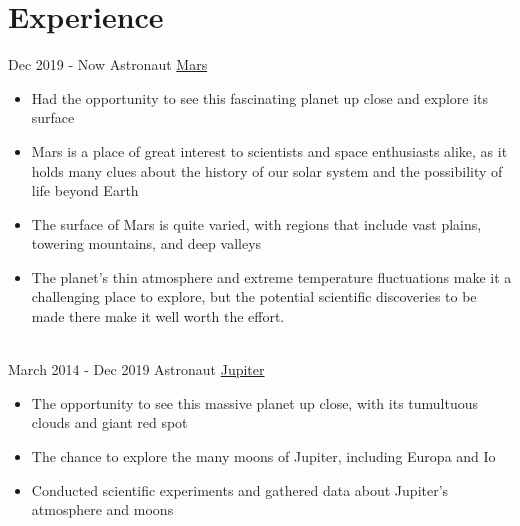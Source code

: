 
\section*{Experience}

\begin{twenty} %
	\twentyitem
	{Dec 2019 - }
	{Now}
	{Astronaut}
	{\href{https://en.wikipedia.org/wiki/Mars}{Mars}}
	{}
	{\begin{itemize}
	\item Had the opportunity to see this fascinating planet up close and explore its surface

	\item Mars is a place of great interest to scientists and space enthusiasts alike, as it holds many clues about the history of our solar system and the possibility of life beyond Earth
	
	\item The surface of Mars is quite varied, with regions that include vast plains, towering mountains, and deep valleys
	
	\item The planet's thin atmosphere and extreme temperature fluctuations make it a challenging place to explore, but the potential scientific discoveries to be made there make it well worth the effort.
	
	\end{itemize}}
	\\
	\twentyitem
	{March 2014 - }
	{Dec 2019}
	{Astronaut}
	{\href{https://en.wikipedia.org/wiki/Jupiter}{Jupiter}}
	{}
	{\begin{itemize}
			\item The opportunity to see this massive planet up close, with its tumultuous clouds and giant red spot		
			\item The chance to explore the many moons of Jupiter, including Europa and Io
			\item Conducted scientific experiments and gathered data about Jupiter's atmosphere and moons
	\end{itemize}}
	\\
	

\end{twenty}
